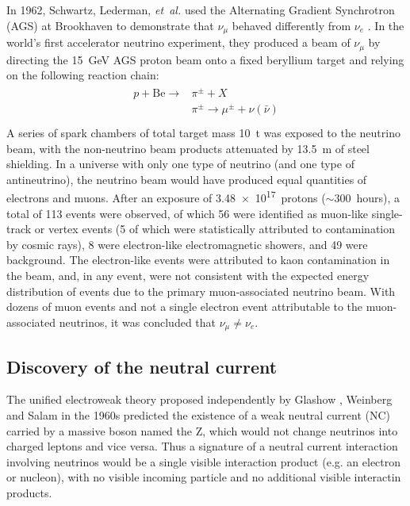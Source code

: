 In 1962, Schwartz, Lederman, \emph{et~al.} used the
Alternating Gradient Synchrotron (AGS) at Brookhaven
to demonstrate that $\nu_\mu$ behaved differently from $\nu_e$
\cite{numu_vs_nue}.
In the world's first accelerator neutrino experiment,
they produced a beam of $\nu_\mu$ by directing
the \SI{15}{\GeV} AGS proton beam
onto a fixed beryllium target and relying on the following reaction chain:
\begin{align}\label{eq:accel_reaction_chain}
    \begin{split}
        p + \text{Be} \to &\pi^{\pm} + X \\
        &\pi^{\pm} \to \mu^{\pm} + \nu(\bar{\nu}) \\
    \end{split}
\end{align}
A series of spark chambers of total target mass \SI{10}{\tonne}
was exposed to the neutrino beam,
with the non-neutrino beam products attenuated
by \SI{13.5}{\m} of steel shielding.
In a universe with only one type of neutrino (and one type of antineutrino),
the neutrino beam would have produced equal quantities
of electrons and muons.
After an exposure of \num{3.48e17}~protons ($\sim300$~hours),
a total of 113 events were observed,
of which 56 were identified as muon-like single-track or vertex events
(5 of which were statistically attributed to contamination by cosmic rays),
8 were electron-like electromagnetic showers, and 49 were background.
The electron-like events were attributed to
kaon contamination in the beam,
and, in any event, were not consistent with the
expected energy distribution of events due to the
primary muon-associated neutrino beam.
With dozens of muon events and not a single electron event
attributable to the muon-associated neutrinos,
it was concluded that $\nu_\mu \neq \nu_e$.


\subsection{Discovery of the neutral current}
\label{subsec:neutral_current}

The unified electroweak theory proposed independently by
Glashow \cite{glashow}, Weinberg \cite{weinberg} and Salam \cite{salam}
in the 1960s
predicted the existence of a weak neutral current (NC)
carried by a massive boson named the Z,
which would not change neutrinos into charged leptons and vice versa.
Thus a signature of a neutral current interaction involving neutrinos
would be a single visible interaction product (e.g. an electron or nucleon),
with no visible incoming particle and no additional visible interactin products.

